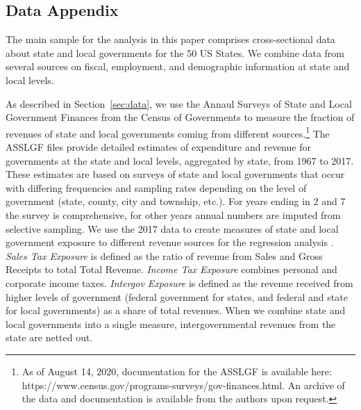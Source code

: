 
\subsection*{Data Appendix}
\label{sec:dataappendix}

The main sample for the analysis in this paper comprises cross-sectional data about state and local governments for the 50 US States. We combine data from several sources on fiscal, employment, and demographic information at state and local levels. 

As described in Section~\ref{sec:data}, we use the Annaul Surveys of State and Local Government Finances from the Census of Governments to measure the fraction of revenues of state and local governments coming from different sources.\footnote{As of August 14, 2020, documentation for the ASSLGF is available here: https://www.census.gov/programs-surveys/gov-finances.html. An archive of the data and documentation is available from the authors upon request.} The ASSLGF files provide detailed estimates of expenditure and revenue for governments at the state and local levels, aggregated by state, from 1967 to 2017. These estimates are based on surveys of state and local governments that occur with differing frequencies and sampling rates depending on the level of government (state, county, city and township, etc.). For years ending in 2 and 7 the survey is comprehensive, for other years annual numbers are imputed from selective sampling. We use the 2017 data to create measures of state and local government exposure to different revenue sources for the regression analysis	. \emph{Sales Tax Exposure} is defined as the ratio of revenue from Sales and Gross Receipts to total Total Revenue. \emph{Income Tax Exposure} combines personal and corporate income taxes. \emph{Intergov Exposure} is defined as the revenue received from higher levels of government (federal government for states, and federal and state for local governments) as a share of total revenues. When we combine state and local governments into a single measure, intergovernmental revenues from the state are netted out. 

